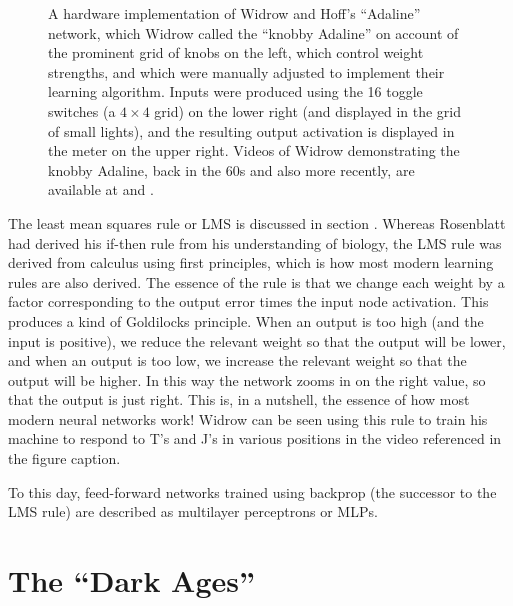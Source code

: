 \begin{figure}[h]
\centering
{}
\caption[From \cite{widrow1963adaline}.]{A hardware implementation of Widrow and Hoff's ``Adaline'' network, which Widrow called the ``knobby Adaline'' on account of the prominent grid of knobs on the left, which control weight strengths, and which were manually adjusted to implement their learning algorithm. Inputs were produced using the 16 toggle switches (a $4 \times 4$ grid) on the lower right (and displayed in the grid of small lights), and the resulting output activation is displayed in the meter on the upper right. Videos of Widrow demonstrating the knobby Adaline, back in the 60s and also more recently, are available at  and .}
\label{adaline}
\end{figure}

The least mean squares rule or LMS is discussed in section . Whereas Rosenblatt had derived his if-then rule from his understanding of biology, the LMS rule was derived from calculus using first principles, which is how most modern learning rules are also derived. The essence of the rule is that we change each weight by a factor corresponding to the output error times the input node activation. This produces a kind of Goldilocks principle. When an output is too high (and the input is positive), we reduce the relevant weight so that the output will be lower, and  when an output is too low, we increase the relevant weight so that the output will be higher. In this way the network zooms in on the right value, so that the output is just right. This is, in a nutshell, the essence of how most modern neural networks work!  Widrow can be seen using this rule to train his machine to respond to T's and J's in various positions in the video referenced in the figure caption.

To this day, feed-forward networks trained using backprop (the successor to the LMS rule) are described as multilayer perceptrons or MLPs.  

\section{The ``Dark Ages''}\label{dark_ages}

